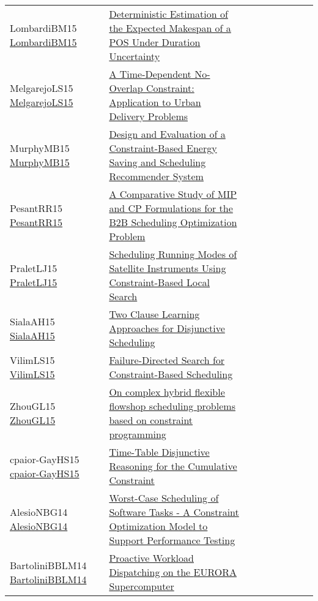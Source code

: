 {\begin{longtable}{p{3cm}p{7cm}lllllll}
LombardiBM15 \href{https://doi.org/10.1007/978-3-319-23219-5\_20}{LombardiBM15} &  \href{papers/LombardiBM15.pdf}{Deterministic Estimation of the Expected Makespan of a {POS} Under Duration Uncertainty} &  &  &  &  &  &  & \\
MelgarejoLS15 \href{https://doi.org/10.1007/978-3-319-18008-3\_1}{MelgarejoLS15} &  \href{papers/MelgarejoLS15.pdf}{A Time-Dependent No-Overlap Constraint: Application to Urban Delivery Problems} &  &  &  &  &  &  & \\
MurphyMB15 \href{https://doi.org/10.1007/978-3-319-23219-5\_47}{MurphyMB15} &  \href{papers/MurphyMB15.pdf}{Design and Evaluation of a Constraint-Based Energy Saving and Scheduling Recommender System} &  &  &  &  &  &  & \\
PesantRR15 \href{https://doi.org/10.1007/978-3-319-18008-3\_21}{PesantRR15} &  \href{papers/PesantRR15.pdf}{A Comparative Study of {MIP} and {CP} Formulations for the {B2B} Scheduling Optimization Problem} &  &  &  &  &  &  & \\
PraletLJ15 \href{https://doi.org/10.1007/978-3-319-23219-5\_48}{PraletLJ15} &  \href{papers/PraletLJ15.pdf}{Scheduling Running Modes of Satellite Instruments Using Constraint-Based Local Search} &  &  &  &  &  &  & \\
SialaAH15 \href{https://doi.org/10.1007/978-3-319-23219-5\_28}{SialaAH15} &  \href{papers/SialaAH15.pdf}{Two Clause Learning Approaches for Disjunctive Scheduling} &  &  &  &  &  &  & \\
VilimLS15 \href{https://doi.org/10.1007/978-3-319-18008-3\_30}{VilimLS15} &  \href{papers/VilimLS15.pdf}{Failure-Directed Search for Constraint-Based Scheduling} &  &  &  &  &  &  & \\
ZhouGL15 \href{https://doi.org/10.1109/FSKD.2015.7382064}{ZhouGL15} &  \href{papers/ZhouGL15.pdf}{On complex hybrid flexible flowshop scheduling problems based on constraint programming} &  &  &  &  &  &  & \\
cpaior-GayHS15 \href{https://doi.org/10.1007/978-3-319-18008-3\_11}{cpaior-GayHS15} &  \href{papers/cpaior-GayHS15.pdf}{Time-Table Disjunctive Reasoning for the Cumulative Constraint} &  &  &  &  &  &  & \\
AlesioNBG14 \href{https://doi.org/10.1007/978-3-319-10428-7\_58}{AlesioNBG14} &  \href{papers/AlesioNBG14.pdf}{Worst-Case Scheduling of Software Tasks - {A} Constraint Optimization Model to Support Performance Testing} &  &  &  &  &  &  & \\
BartoliniBBLM14 \href{https://doi.org/10.1007/978-3-319-10428-7\_55}{BartoliniBBLM14} &  \href{papers/BartoliniBBLM14.pdf}{Proactive Workload Dispatching on the {EURORA} Supercomputer} &  &  &  &  &  &  & \\

\end{longtable}}
